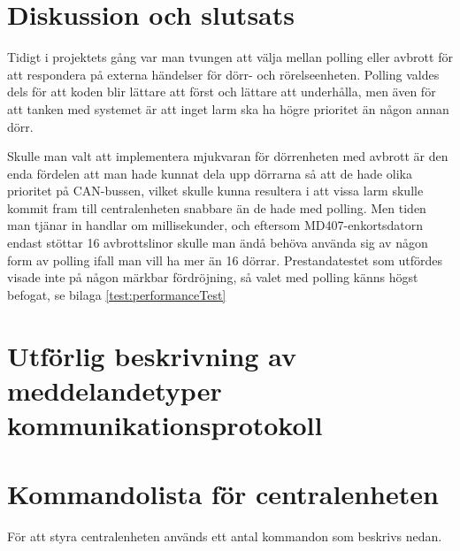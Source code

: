 \documentclass{article}
\begin{document}
\newpage
\section{Diskussion och slutsats}

Tidigt i projektets gång var man tvungen att välja mellan polling eller avbrott för att respondera på externa händelser för dörr- och rörelseenheten.  Polling valdes dels för att koden blir lättare att först och lättare att underhålla, men även för att tanken med systemet är att inget larm ska ha högre prioritet än någon annan dörr. 

Skulle man valt att implementera mjukvaran för dörrenheten med avbrott är den enda fördelen att man hade kunnat dela upp dörrarna så att de hade olika prioritet på CAN-bussen, vilket skulle kunna resultera i att vissa larm skulle kommit fram till centralenheten snabbare än de hade med polling. Men tiden man tjänar in handlar om millisekunder, och eftersom MD407-enkortsdatorn endast stöttar 16 avbrottslinor skulle man ändå behöva använda sig av någon form av polling ifall man vill ha mer än 16 dörrar. Prestandatestet som utfördes visade inte på någon märkbar fördröjning, så valet med polling känns högst befogat,  se bilaga \ref{test:performanceTest}






\appendix
    \section{Utförlig beskrivning av meddelandetyper kommunikationsprotokoll}
    \label{bilaga:protokoll}
        

    \section{Kommandolista för centralenheten}
    \label{kommandon}
        För att styra centralenheten används ett antal kommandon som beskrivs nedan.
\end{document}

